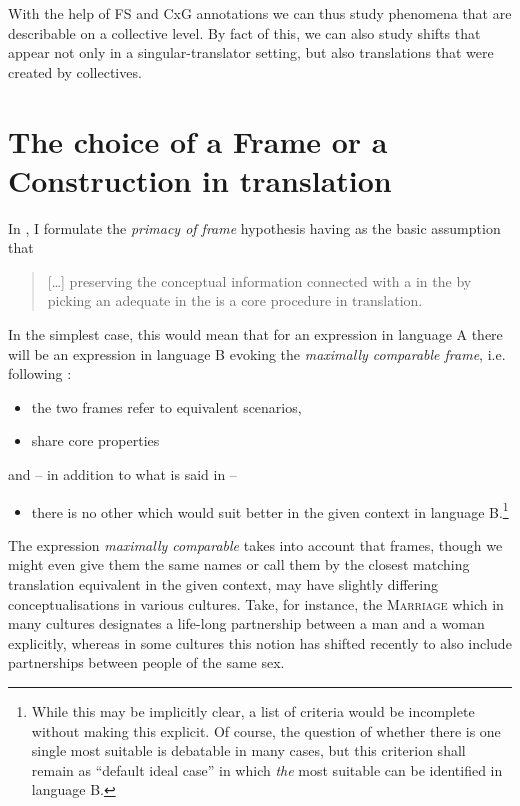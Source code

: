 \documentclass[output=paper]{LSP/langsci}
\begin{document}
With the help of FS and CxG annotations we can thus study phenomena that are describable on a collective level. By fact of this, we can also study shifts that appear not only in a singular-translator setting, but also translations that were created by collectives.

\section{The choice of a Frame or a Construction in translation}\label{czulo:sec:4}
 

In \citet{Culo2013}, I formulate the \textit{primacy of frame} hypothesis having as the basic assumption that

\begin{quote}
[\ldots] preserving the conceptual information connected with a  in the  by picking an adequate  in the  is a core procedure in translation. \citep[144]{Culo2013}
\end{quote}

In the simplest case, this would mean that for an expression in language A there will be an expression in language B evoking the \textit{maximally comparable frame}, i.e. following \citet[145]{Culo2013}: 

\begin{itemize}
\item the two frames refer to equivalent scenarios, 
\item share core properties 
\end{itemize}
and -- in addition to what is said in \citet{Culo2013} -- 
\begin{itemize}
\item there is no other  which would suit better in the given context in language B.\footnote{While this may be implicitly clear, a list of criteria would be incomplete without making this explicit. Of course, the question of whether there is one single most suitable  is debatable in many cases, but this criterion shall remain as ``default ideal case'' in which \textit{the} most suitable  can be identified in language B.}
\end{itemize}

The expression \textit{maximally comparable} takes into account that frames, though we might even give them the same names or call them by the closest matching translation equivalent in the given context, may have slightly differing conceptualisations in various cultures. Take, for instance, the \textsc{Marriage}  which in many cultures designates a life-long partnership between a man and a woman explicitly, whereas in some cultures this notion has shifted recently to also include partnerships between people of the same sex. 
\end{document}
